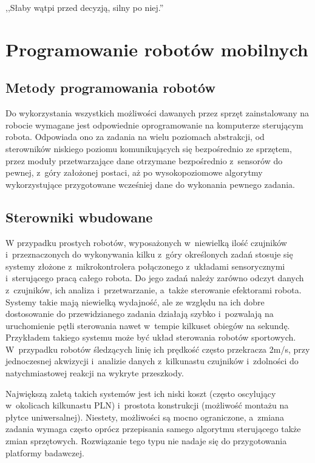 

\begin{savequote}[70mm]
,,Słaby wątpi przed decyzją, silny po niej.''
\end{savequote}


\chapter{Programowanie robotów mobilnych}
\label{chap:programowanie}

\section{Metody programowania robotów}

Do wykorzystania wszystkich możliwości dawanych przez sprzęt zainstalowany na robocie
wymagane jest odpowiednie oprogramowanie na komputerze sterującym robota. Odpowiada
ono za zadania na wielu poziomach abstrakcji, od sterowników niskiego poziomu
komunikujących się bezpośrednio ze sprzętem, przez moduły przetwarzające dane otrzymane
bezpośrednio z~sensorów do pewnej, z~góry założonej postaci, aż po wysokopoziomowe
algorytmy wykorzystujące przygotowane wcześniej dane do wykonania pewnego zadania.

\section{Sterowniki wbudowane}

W przypadku prostych robotów, wyposażonych w~niewielką ilość czujników
i~przeznaczonych do wykonywania kilku z~góry określonych zadań stosuje się systemy
złożone z~mikrokontrolera połączonego z~układami sensorycznymi i~sterującego pracą
całego robota. Do jego zadań należy zarówno odczyt danych z~czujników, ich analiza
i~przetwarzanie, a~także sterowanie efektorami robota. Systemy takie mają niewielką
wydajność, ale ze względu na ich dobre dostosowanie do przewidzianego zadania działają
szybko i~pozwalają na uruchomienie pętli sterowania nawet w~tempie kilkuset obiegów na sekundę.
Przykładem takiego systemu może być układ sterowania robotów sportowych. W~przypadku
robotów śledzących linię ich prędkość często przekracza 2m/s, przy jednoczesnej
akwizycji i~analizie danych z~kilkunastu czujników i~zdolności do natychmiastowej
reakcji na wykryte przeszkody.

Największą zaletą takich systemów jest ich niski koszt (często oscylujący w~okolicach
kilkunastu PLN) i~prostota konstrukcji (możliwość montażu na płytce uniwersalnej).
Niestety, możliwości są mocno ograniczone, a~zmiana zadania wymaga często oprócz przepisania
samego algorytmu sterującego także zmian sprzętowych. Rozwiązanie tego typu nie nadaje
się do przygotowania platformy badawczej.

